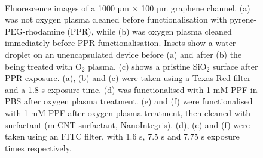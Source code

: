 \documentclass[
  a4paper,
]{scrbook}
\begin{document}
\begin{figure}
\begin{minipage}[t]{0.45\linewidth}
{{}

}

\end{minipage}%
%
\begin{minipage}[t]{0.01\linewidth}

{\centering 

~

}

\end{minipage}%

\caption[Fluorescence images of a 1000 µm \(\times\) 100 µm graphene
channel showing the effects of oxygen plasma cleaning and surfactant
cleaning on fluorescent linker
functionalisation.]{\label{fig-silicon-dioxide-interaction}Fluorescence
images of a 1000 µm \(\times\) 100 µm graphene channel. (a) was not
oxygen plasma cleaned before functionalisation with pyrene-PEG-rhodamine
(PPR), while (b) was oxygen plasma cleaned immediately before PPR
functionalisation. Insets show a water droplet on an unencapsulated
device before (a) and after (b) the being treated with O\(_2\) plasma.
(c) shows a pristine SiO\(_2\) surface after PPR exposure. (a), (b) and
(c) were taken using a Texas Red filter and a 1.8 s exposure time. (d)
was functionalised with 1 mM PPF in PBS after oxygen plasma treatment.
(e) and (f) were functionalised with 1 mM PPF after oxygen plasma
treatment, then cleaned with surfactant (m-CNT surfactant,
NanoIntegris). (d), (e) and (f) were taken using an FITC filter, with
1.6 s, 7.5 s and 7.75 s exposure times respectively.}

\end{figure}
\end{document}
